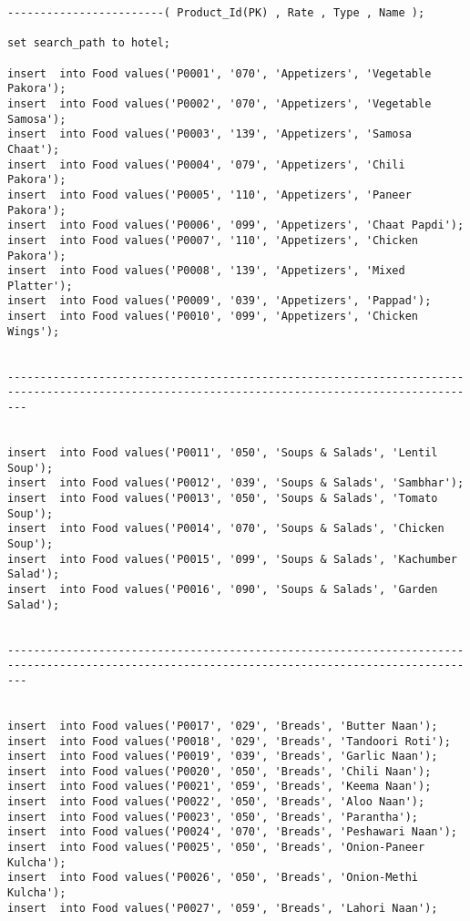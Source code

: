 \documentclass[a4,12pt]{report}
\begin{document}
\begin{lstlisting}
------------------------( Product_Id(PK) , Rate , Type , Name );

set search_path to hotel;

insert  into Food values('P0001', '070', 'Appetizers', 'Vegetable Pakora');
insert  into Food values('P0002', '070', 'Appetizers', 'Vegetable Samosa');
insert  into Food values('P0003', '139', 'Appetizers', 'Samosa Chaat');
insert  into Food values('P0004', '079', 'Appetizers', 'Chili Pakora');
insert  into Food values('P0005', '110', 'Appetizers', 'Paneer Pakora');
insert  into Food values('P0006', '099', 'Appetizers', 'Chaat Papdi');
insert  into Food values('P0007', '110', 'Appetizers', 'Chicken Pakora');
insert  into Food values('P0008', '139', 'Appetizers', 'Mixed Platter');
insert  into Food values('P0009', '039', 'Appetizers', 'Pappad');
insert  into Food values('P0010', '099', 'Appetizers', 'Chicken Wings');


-----------------------------------------------------------------------------------------------------------------------------------------------


insert  into Food values('P0011', '050', 'Soups & Salads', 'Lentil Soup');
insert  into Food values('P0012', '039', 'Soups & Salads', 'Sambhar');
insert  into Food values('P0013', '050', 'Soups & Salads', 'Tomato Soup');
insert  into Food values('P0014', '070', 'Soups & Salads', 'Chicken Soup');
insert  into Food values('P0015', '099', 'Soups & Salads', 'Kachumber Salad');
insert  into Food values('P0016', '090', 'Soups & Salads', 'Garden Salad');


-----------------------------------------------------------------------------------------------------------------------------------------------


insert  into Food values('P0017', '029', 'Breads', 'Butter Naan');
insert  into Food values('P0018', '029', 'Breads', 'Tandoori Roti');
insert  into Food values('P0019', '039', 'Breads', 'Garlic Naan');
insert  into Food values('P0020', '050', 'Breads', 'Chili Naan');
insert  into Food values('P0021', '059', 'Breads', 'Keema Naan');
insert  into Food values('P0022', '050', 'Breads', 'Aloo Naan');
insert  into Food values('P0023', '050', 'Breads', 'Parantha');
insert  into Food values('P0024', '070', 'Breads', 'Peshawari Naan');
insert  into Food values('P0025', '050', 'Breads', 'Onion-Paneer Kulcha');
insert  into Food values('P0026', '050', 'Breads', 'Onion-Methi Kulcha');
insert  into Food values('P0027', '059', 'Breads', 'Lahori Naan');



\end{lstlisting}
\end{document}
